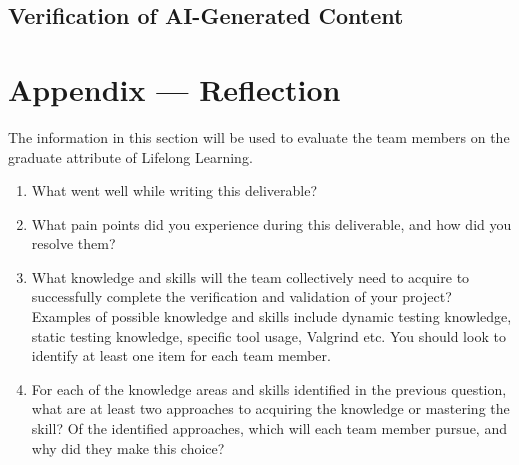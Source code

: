 \documentclass[12pt, titlepage]{article}
\begin{document}


\subsection{Verification of AI-Generated Content}


\newpage{}

\section{Appendix --- Reflection}


The information in this section will be used to evaluate the team members on the
graduate attribute of Lifelong Learning.



\begin{enumerate}
  \item What went well while writing this deliverable? 
  \item What pain points did you experience during this deliverable, and how
    did you resolve them?
  \item What knowledge and skills will the team collectively need to acquire to
  successfully complete the verification and validation of your project?
  Examples of possible knowledge and skills include dynamic testing knowledge,
  static testing knowledge, specific tool usage, Valgrind etc.  You should look to
  identify at least one item for each team member.
  \item For each of the knowledge areas and skills identified in the previous
  question, what are at least two approaches to acquiring the knowledge or
  mastering the skill?  Of the identified approaches, which will each team
  member pursue, and why did they make this choice?
\end{enumerate}
\end{document}
